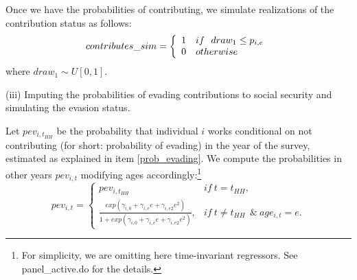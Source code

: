\documentclass{article}
\begin{document}
\begin{enumerate}

Once we have the probabilities of contributing, we simulate realizations of the contribution status as follows:
\begin{equation}
        contributes\_sim = \left \{ \begin{array}{ll}
         1 & if \ \ draw_1 \leq p_{i,e}  \\
         0 & otherwise 
            \end{array} \right .\\
\end{equation}
where $draw_1 \sim U[0,1]$.

(iii)  Imputing the probabilities of  evading contributions to social security and simulating the evasion status.

Let $pev_{i,t_{HH}}$ be  the probability that individual $i$ works conditional on not contributing (for short: probability of evading) in the year of the survey, estimated as explained in item \ref{prob_evading}. We compute the probabilities in other years $pev_{i,t}$ modifying ages accordingly:\footnote{For simplicity, we are omitting here time-invariant regressors. See panel\_active.do for the details. }
\begin{equation}
        pev_{i,t}= \left\{\begin{array}{ll}
            pev_{i,t_{HH}} & if \ t = t_{HH}, \\
            \frac{exp(\gamma_{i,0} +\gamma_{i,e} e + \gamma_{i,e2} e^2)}{1+ exp(\gamma_{i,0} +\gamma_{i,e} e + \gamma_{i,e2} e^2)},&  if  \ t \neq t_{HH} \ \ \& \ age_{i,t}=e. 
        \end{array} \right .
    \end{equation}


\end{enumerate}
\end{document}
